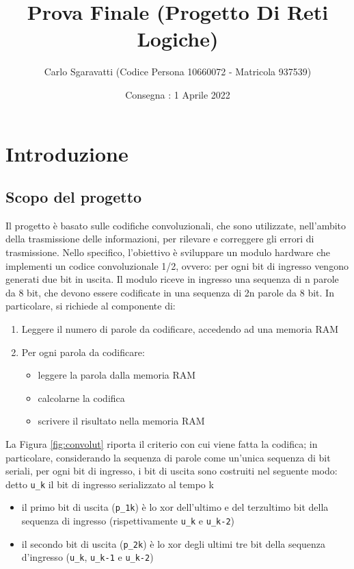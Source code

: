 \documentclass{article}
\title{Prova Finale (Progetto Di Reti Logiche)}
\author{Carlo Sgaravatti (Codice Persona 10660072 - Matricola 937539)}
\date{Consegna : 1 Aprile 2022}
\begin{document}
\maketitle
\tableofcontents


\section{Introduzione}

\subsection{Scopo del progetto}

Il progetto è basato sulle codifiche convoluzionali, che sono utilizzate, nell’ambito della trasmissione delle informazioni, per rilevare e correggere gli errori di trasmissione. Nello specifico, l'obiettivo è sviluppare un modulo hardware che implementi un codice convoluzionale 1/2, ovvero: per ogni bit di ingresso vengono generati due bit in uscita.
\newline Il modulo riceve in ingresso una sequenza di n parole da 8 bit, che devono essere codificate in una sequenza di 2n parole da 8 bit. In particolare, si richiede al componente di:
\begin{enumerate}
    \item Leggere il numero di parole da codificare, accedendo ad una memoria RAM
    \item Per ogni parola da codificare:
    \begin{itemize}
        \item leggere la parola dalla memoria RAM
        \item calcolarne la codifica
        \item scrivere il risultato nella memoria RAM
    \end{itemize}
\end{enumerate}
La Figura \ref{fig:convolut} riporta il criterio con cui viene fatta la codifica; in particolare, considerando la sequenza di parole come un'unica sequenza di bit seriali, per ogni bit di ingresso, i bit di uscita sono costruiti nel seguente modo: detto \texttt{u\_k} il bit di ingresso serializzato al tempo k
\begin{itemize}
    \item il primo bit di uscita (\texttt{p\_1k}) è lo xor dell'ultimo e del terzultimo bit della sequenza di ingresso (rispettivamente \texttt{u\_k} e \texttt{u\_k-2})
    \item il secondo bit di uscita (\texttt{p\_2k}) è lo xor degli ultimi tre bit della sequenza d'ingresso (\texttt{u\_k}, \texttt{u\_k-1} e \texttt{u\_k-2})
\end{itemize}
\end{document}

